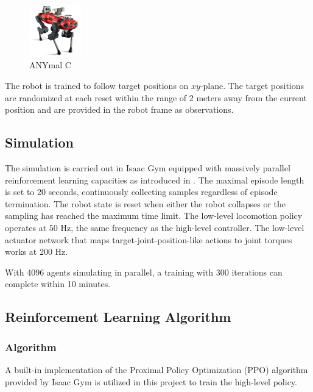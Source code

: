 \documentclass{article}
\begin{document}
\begin{figure}[htbp]
	\centering
	\includegraphics[width=0.2\textwidth]{Project/figs/anymal.png} 
	\caption{ANYmal C}
	\label{fig:anymal}
\end{figure}

The robot is trained to follow target positions on $xy$-plane. The target positions are randomized at each reset within the range of 2 meters away from the current position and are provided in the robot frame as observations.

\subsection{Simulation}
The simulation is carried out in Isaac Gym equipped with massively parallel reinforcement learning capacities as introduced in \cite{makoviychuk2021isaac}. The maximal episode length is set to 20 seconds, continuously collecting samples regardless of episode termination. The robot state is reset when either the robot collapses or the sampling has reached the maximum time limit. The low-level locomotion policy operates at 50 Hz, the same frequency as the high-level controller. The low-level actuator network that maps target-joint-position-like actions to joint torques works at 200 Hz.

With 4096 agents simulating in parallel, a training with 300 iterations can complete within 10 minutes.

\subsection{Reinforcement Learning Algorithm}

\subsubsection{Algorithm}
A built-in implementation of the Proximal Policy Optimization (PPO) algorithm provided by Isaac Gym is utilized in this project to train the high-level policy.

\end{document}

